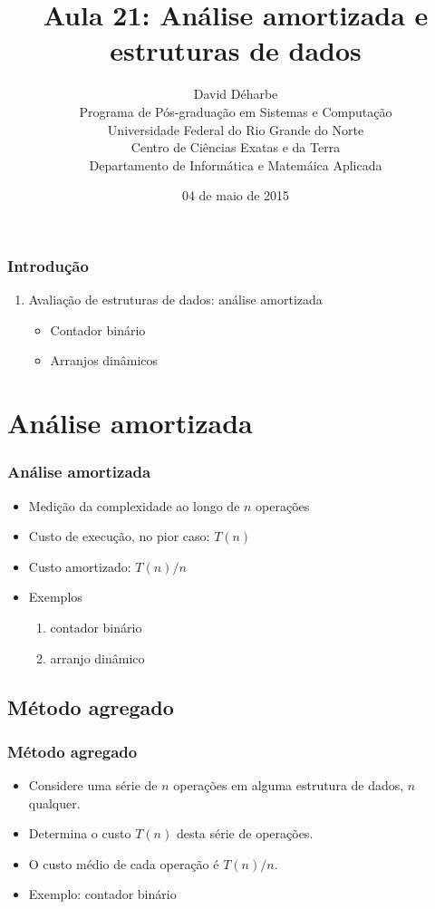 \documentclass{beamer}
\title{Aula 21: Análise amortizada e estruturas de dados}
\author{David Déharbe \\
  Programa de Pós-graduação em Sistemas e Computação \\
  Universidade Federal do Rio Grande do Norte \\
  Centro de Ciências Exatas e da Terra \\
  Departamento de Informática e Matemáica Aplicada}
\date{04 de maio de 2015}
\begin{document}

\begin{frame}
  \titlepage
\end{frame}

\begin{frame}
  \frametitle{Introdução}
  \tableofcontents

  \begin{enumerate}
    \item Avaliação de estruturas de dados: análise amortizada
      \begin{itemize}
        \item Contador binário
        \item Arranjos dinâmicos
      \end{itemize}
  \end{enumerate}

\end{frame}

\section{Análise amortizada}

\begin{frame}
\frametitle{Análise amortizada}

\begin{itemize}
\item Medição da complexidade ao longo de $n$ operações
\item Custo de execução, no pior caso: $T(n)$
\item Custo amortizado: $T(n)/n$
\item Exemplos
\begin{enumerate}
  \item contador binário
  \item arranjo dinâmico
\end{enumerate}
\end{itemize}
\end{frame}

\subsection{Método agregado}

\begin{frame}

\frametitle{Método agregado}

\begin{itemize}
\item Considere uma série de $n$ operações em alguma estrutura de dados, $n$
  qualquer.

\item Determina o custo $T(n)$ desta série de operações.

\item O custo médio de cada operação é $T(n)/n$.

\item Exemplo: contador binário
\end{itemize}

\end{frame}
\end{document}
